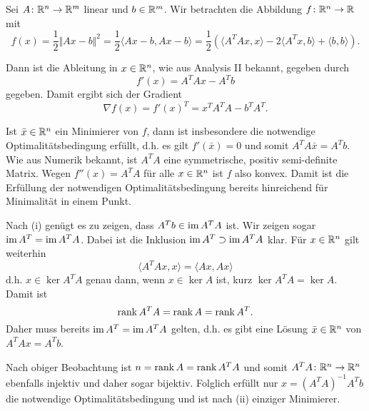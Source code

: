 Sei $A\colon \mathbb{R}^n\to\mathbb{R}^m$ linear und $b\in\mathbb{R}^m$. Wir betrachten die Abbildung $f\colon \mathbb{R}^n\to\mathbb{R}$ mit
\begin{displaymath}
 f(x)=\frac{1}{2}\Vert Ax-b\Vert^2=\frac{1}{2}\langle Ax-b,Ax-b\rangle=\frac{1}{2}(\langle A^TAx,x\rangle-2\langle A^Tx,b\rangle+\langle b,b\rangle).
\end{displaymath}
\begin{compactenum}[(i)]
 \item Dann ist die Ableitung in $x\in\mathbb{R}^n$, wie aus Analysis II bekannt, gegeben durch
 \begin{displaymath}
 f'(x)=  A^TAx- A^Tb
 \end{displaymath}
 gegeben. Damit ergibt sich der Gradient
 \begin{displaymath}
  \nabla f(x) = f'(x)^T= x^TA^TA-b^TA^T.
 \end{displaymath}
 \item Ist $\bar x\in\mathbb{R}^n$ ein Minimierer von $f$, dann ist insbesondere die notwendige Optimalitätsbedingung erfüllt, d.h. es gilt $f'(\bar x)=0$
 und somit $A^TA\bar x=A^Tb$. Wie aus Numerik bekannt, ist $A^TA$ eine symmetrische, positiv semi-definite Matrix. Wegen $f''(x)=A^TA$ für alle $x\in\mathbb{R}^n$ ist $f$ also konvex.
 Damit ist die Erfüllung der notwendigen Optimalitätsbedingung bereits hinreichend für Minimalität in einem Punkt.\\
 \item Nach (i) genügt es zu zeigen, dass $A^Tb\in\operatorname{im} A^TA$ ist. Wir zeigen sogar $\operatorname{im} A^T = \operatorname{im} A^TA$. Dabei ist die Inklusion $\operatorname{im} A^T \supset \operatorname{im} A^TA$ klar. Für $x\in\mathbb{R}^n$
 gilt weiterhin
 \begin{displaymath}
  \langle A^TAx,x\rangle=\langle Ax, Ax\rangle
 \end{displaymath}
 d.h. $x\in \ker A^TA$ genau dann, wenn $x\in \ker A$ ist, kurz $\ker A^TA=\ker A$. Damit ist 
 \begin{displaymath}
  \operatorname{rank} A^T A=\operatorname{rank} A=\operatorname{rank} A^T.
 \end{displaymath}
 Daher muss bereits $\operatorname{im} A^T = \operatorname{im} A^TA$ gelten, d.h. es gibt eine Lösung $\bar x\in\mathbb{R}^n$ von $A^TAx=A^Tb$.\\
 \item Nach obiger Beobachtung ist $n=\operatorname{rank} A=\operatorname{rank} A^TA$ und somit $A^TA\colon \mathbb{R}^n\to\mathbb{R}^n$ ebenfalls injektiv und daher sogar bijektiv. Folglich erfüllt nur $x=(A^TA)^{-1}A^Tb$ die notwendige Optimalitätsbedingung
 und ist nach (ii) einziger Minimierer.
\end{compactenum}
